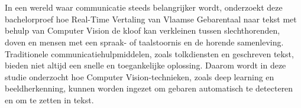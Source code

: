 
%
%
%
%
%

%



\chapter*{}

In een wereld waar communicatie steeds belangrijker wordt, onderzoekt deze bachelorproef hoe Real-Time Vertaling van Vlaamse Gebarentaal naar tekst met behulp van Computer Vision de kloof kan verkleinen tussen slechthorenden, doven en mensen met een spraak- of taalstoornis en de horende samenleving. 
Traditionele communicatiehulpmiddelen, zoals tolkdiensten en geschreven tekst, bieden niet altijd een snelle en toegankelijke oplossing. 
Daarom wordt in deze studie onderzocht hoe Computer Vision-technieken, zoals deep learning en beeldherkenning, kunnen worden ingezet om gebaren automatisch te detecteren en om te zetten in tekst.

